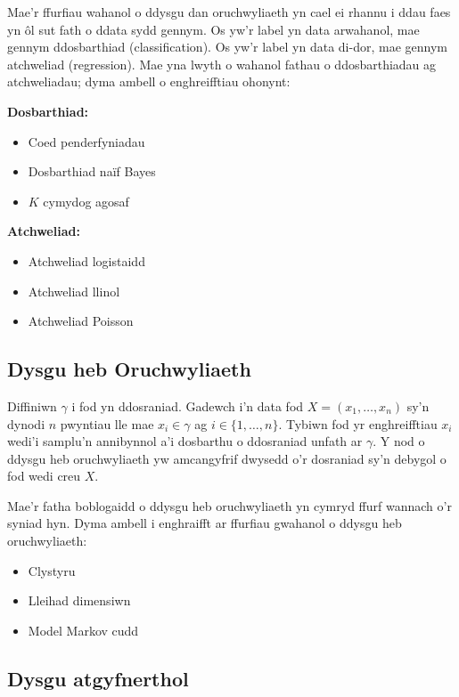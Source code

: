 Mae'r ffurfiau wahanol o ddysgu dan oruchwyliaeth yn cael ei rhannu i ddau faes yn \^{o}l sut fath o ddata sydd gennym. Os yw'r label yn data arwahanol, mae gennym ddosbarthiad (classification). Os yw'r label yn data di-dor, mae gennym atchweliad (regression). Mae yna lwyth o wahanol fathau o ddosbarthiadau ag atchweliadau; dyma ambell o enghreifftiau ohonynt:

\begin{multicols}{2}
\textbf{Dosbarthiad:}

\begin{itemize}
	\item Coed penderfyniadau
	\item Dosbarthiad na\"{i}f Bayes 
	\item $K$ cymydog agosaf
\end{itemize} 

\textbf{Atchweliad:}

\begin{itemize}
	\item Atchweliad logistaidd
	\item Atchweliad llinol
	\item Atchweliad Poisson
\end{itemize}
\end{multicols}

\subsection{Dysgu heb Oruchwyliaeth}

Diffiniwn $\gamma$ i fod yn ddosraniad. Gadewch i'n data fod $X = (x_{1}, \dots, x_{n})$ sy'n dynodi $n$ pwyntiau lle mae $x_{i} \in \gamma$ ag $i \in \{ 1, \dots, n \}$. Tybiwn fod yr enghreifftiau $x_{i}$ wedi'i samplu'n annibynnol a'i dosbarthu o ddosraniad unfath ar $\gamma$. Y nod o ddysgu heb oruchwyliaeth yw amcangyfrif dwysedd o'r dosraniad sy'n debygol o fod wedi creu $X$.\cite{dysgu-peirianyddol}

Mae'r fatha boblogaidd o ddysgu heb oruchwyliaeth yn cymryd ffurf wannach o'r syniad hyn. Dyma ambell i enghraifft ar ffurfiau gwahanol o ddysgu heb oruchwyliaeth:

\begin{itemize}
	\item Clystyru
	\item Lleihad dimensiwn
	\item Model Markov cudd
\end{itemize}

\subsection{Dysgu atgyfnerthol}

